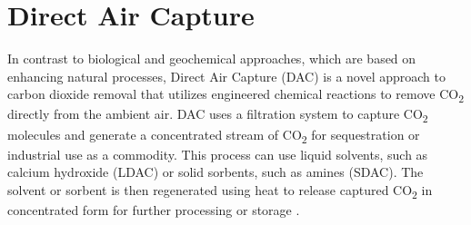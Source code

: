 \section{Direct Air Capture}
In contrast to biological and geochemical approaches, which are based on enhancing natural processes, Direct Air Capture (DAC) is a novel approach to carbon dioxide removal that utilizes engineered chemical reactions to remove CO\textsubscript{2} directly from the ambient air. DAC uses a filtration system to capture CO\textsubscript{2} molecules and generate a concentrated stream of CO\textsubscript{2} for sequestration or industrial use as a commodity. This process can use liquid solvents, such as calcium hydroxide (LDAC) or solid sorbents, such as amines (SDAC). The solvent or sorbent is then regenerated using heat to release captured CO\textsubscript{2} in concentrated form for further processing or storage \parencite{Gorman2021CarbonHerzog, Mulligan2020CarbonShot:States}.
